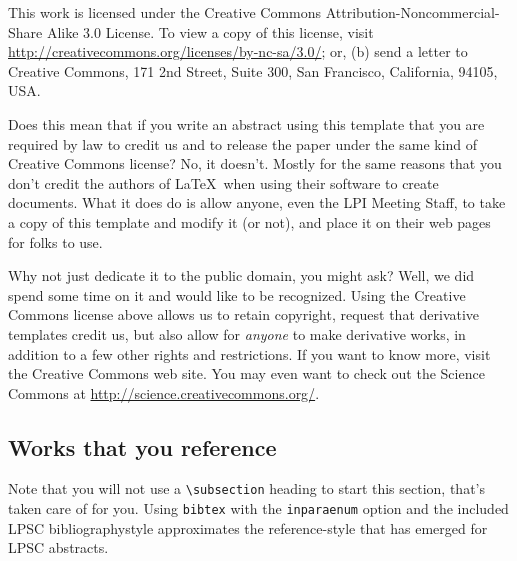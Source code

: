 \documentclass[twoside]{article}
\begin{document}
This work is licensed under the Creative Commons Attribution-Noncommercial-Share Alike 3.0 License.
To view a copy of this license, visit \url{http://creativecommons.org/licenses/by-nc-sa/3.0/}; or, (b) send a letter to Creative Commons, 171 2nd Street, Suite 300, San Francisco, California, 94105, USA.

Does this mean that if you write an abstract using this template that you are required by law to credit us and to release the paper under the same kind of Creative Commons license?
No, it doesn't.
Mostly for the same reasons that you don't credit the authors of \LaTeX\ when using their software to create documents.
What it does do is allow anyone, even the LPI Meeting Staff, to take a copy of this template and modify it (or not), and place it on their web pages for folks
to use.

Why not just dedicate it to the public domain, you might ask?
Well, we did spend some time on it and would like to be recognized.
Using the Creative Commons license above allows us to retain copyright, request that derivative templates credit us, but also allow for \emph{anyone} to make derivative works, in addition to a few other rights and restrictions.
If you want to know more, visit the Creative Commons web site.
You may even want to check out the Science Commons at \url{http://science.creativecommons.org/}.


\subsection*{Works that you reference}
Note that you will not use a \verb=\subsection= heading to start this section, that's taken care of for you.
Using \texttt{bibtex} with the \texttt{inparaenum} option and the included LPSC bibliographystyle approximates the reference-style that has emerged for LPSC abstracts.

\begin{inparaenum}
  
  \fussy
  \raggedright
  
\end{inparaenum}
\end{document}
